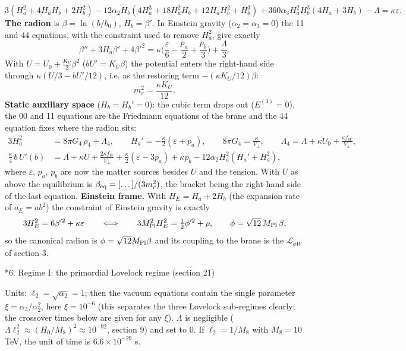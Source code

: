 \documentclass[10pt,a4paper]{article}
\makeatletter
\renewcommand\section{\@startsection{section}{1}{\z@}{-3.5ex \@plus -1ex \@minus -.2ex}{2.3ex \@plus.2ex}{\normalfont\Large\bfseries\raggedright}}
\makeatother
\begin{document}
\begin{equation*}
3(H_a^2+4H_aH_b+2H_b^2)-12\alpha_2H_b(4H_a^3+18H_a^2H_b+12H_aH_b^2+H_b^3)+360\alpha_3H_a^2H_b^3(4H_a+3H_b)-\Lambda=\kappa\varepsilon .
\end{equation*}
\textbf{The radion} is $\beta=\ln(b/b_0)$, $H_b=\beta'$. In Einstein gravity ($\alpha_2=\alpha_3=0$) the 11 and 44 equations, with the constraint used to remove $H_a^2$, give exactly
\begin{equation*}
\beta''+3H_a\beta'+4\beta'^2=\kappa\Big(\frac{\varepsilon}{6}-\frac{p_a}{2}+\frac{p_b}{3}\Big)+\frac{\Lambda}{3}.
\end{equation*}
With $U=U_0+\tfrac{K_U}2\beta^2$ ($bU'=K_U\beta$) the potential enters the right-hand side through $\kappa(U/3-bU'/12)$, i.e. as the restoring term $-(\kappa K_U/12)\beta$:
\begin{equation*}
m_r^2=\frac{\kappa K_U}{12}.
\end{equation*}
\textbf{Static auxiliary space} ($H_b=H_b'=0$): the cubic term drops out ($E^{(3)}=0$), the 00 and 11 equations are the Friedmann equations of the brane and the 44 equation fixes where the radion sits:
\begin{align*}
3H_a^2&=8\pi G_4\,\rho_4+\Lambda_4,\qquad H_a'=-\frac\kappa2(\varepsilon+p_a),\qquad 8\pi G_4=\frac{\kappa}{V_\perp},\qquad \Lambda_4=\Lambda+\kappa U_0+\frac{\kappa f_W}{V_\perp}, \\
\frac\kappa4\,b\,U'(b)&=\Lambda+\kappa U+\frac{2\kappa f_W}{V_\perp}+\frac\kappa2(\varepsilon-3p_a)+\kappa p_b-12\alpha_2H_a^2(H_a'+H_a^2),
\end{align*}
where $\varepsilon$, $p_a$, $p_b$ are now the matter sources besides $U$ and the tension. With $U$ as above the equilibrium is $\beta_{\rm eq}=[\dots]/(3m_r^2)$, the bracket being the right-hand side of the last equation. \textbf{Einstein frame.} With $H_E=H_a+2H_b$ (the expansion rate of $a_E=ab^2$) the constraint of Einstein gravity is exactly
\begin{equation*}
3H_E^2=6\beta'^2+\kappa\varepsilon\qquad\Longleftrightarrow\qquad 3M_{\rm Pl}^2H_E^2=\tfrac12\phi'^2+\rho,\qquad \phi=\sqrt{12}\,M_{\rm Pl}\,\beta,
\end{equation*}
so the canonical radion is $\phi=\sqrt{12}M_{\rm Pl}\beta$ and its coupling to the brane is the $\mathcal L_{\phi W}$ of section 3.

\section*{6. Regime I: the primordial Lovelock regime (section 21)}
Units: $\ell_2=\sqrt{\alpha_2}=1$; then the vacuum equations contain the single parameter $\xi=\alpha_3/\alpha_2^2$, here $\xi=10^{-6}$ (this separates the three Lovelock sub-regimes clearly; the crossover times below are given for any $\xi$). $\Lambda$ is negligible ($\Lambda\ell_2^2\approx(H_0/M_8)^2\approx10^{-92}$, section 9) and set to 0. If $\ell_2=1/M_8$ with $M_8=10$ TeV, the unit of time is $6.6\times10^{-29}$ s.
\end{document}
